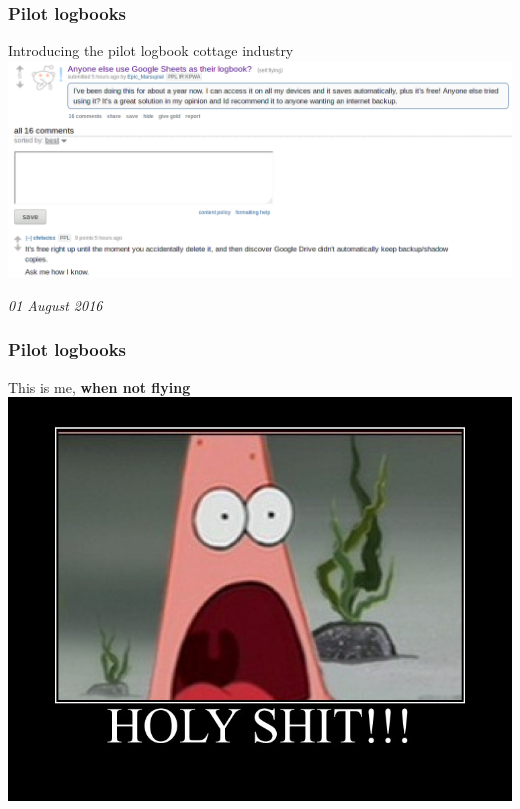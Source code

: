 \begin{frame}
\frametitle{Pilot logbooks}
\begin{block}{Introducing the pilot logbook cottage industry}
\includegraphics[height=0.4\textheight,natwidth=1182,natheight=508]{image/logbook-7.png}
\end{block}
\par
\tiny{\emph{01 August 2016}}
\end{frame}

\begin{frame}
\frametitle{Pilot logbooks}
\begin{block}{This is me, \textbf{when not flying}}
\includegraphics[height=0.5\textheight,natwidth=750,natheight=600]{image/holy-shit.png}
\end{block}
\end{frame}

